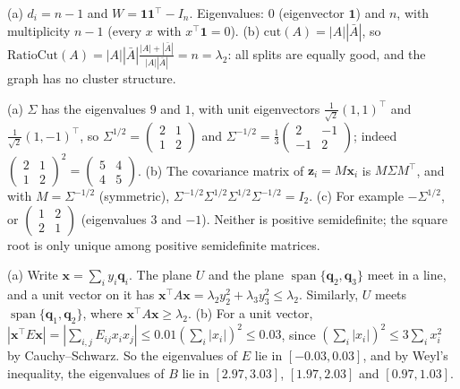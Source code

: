 \documentclass[11pt]{article}
\DeclareMathOperator{\Span}{span}
\begin{document}
\begin{description}[leftmargin=0pt, itemsep=0.3em]
    \item[\ref{pr:laplacian-complete}.] (a) $d_i = n - 1$ and $W = \mathbf{1}\mathbf{1}^\top - I_n$. Eigenvalues: $0$ (eigenvector $\mathbf{1}$) and $n$, with multiplicity $n - 1$ (every $x$ with $x^\top\mathbf{1} = 0$). (b) $\mathrm{cut}(A) = |A||\bar{A}|$, so $\mathrm{RatioCut}(A) = |A||\bar{A}|\frac{|A| + |\bar{A}|}{|A||\bar{A}|} = n = \lambda_2$: all splits are equally good, and the graph has no cluster structure.
    \item[\ref{pr:sqrt-whitening}.] (a) $\Sigma$ has the eigenvalues $9$ and $1$, with unit eigenvectors $\frac{1}{\sqrt{2}}(1, 1)^\top$ and $\frac{1}{\sqrt{2}}(1, -1)^\top$, so $\Sigma^{1/2} = \begin{pmatrix} 2 & 1 \\ 1 & 2 \end{pmatrix}$ and $\Sigma^{-1/2} = \frac{1}{3}\begin{pmatrix} 2 & -1 \\ -1 & 2 \end{pmatrix}$; indeed $\begin{pmatrix} 2 & 1 \\ 1 & 2 \end{pmatrix}^2 = \begin{pmatrix} 5 & 4 \\ 4 & 5 \end{pmatrix}$. (b) The covariance matrix of $\mathbf{z}_i = M\mathbf{x}_i$ is $M\Sigma M^\top$, and with $M = \Sigma^{-1/2}$ (symmetric), $\Sigma^{-1/2}\Sigma^{1/2}\Sigma^{1/2}\Sigma^{-1/2} = I_2$. (c) For example $-\Sigma^{1/2}$, or $\begin{pmatrix} 1 & 2 \\ 2 & 1 \end{pmatrix}$ (eigenvalues $3$ and $-1$). Neither is positive semidefinite; the square root is only unique among positive semidefinite matrices.
    \item[\ref{pr:courant-fischer}.] (a) Write $\mathbf{x} = \sum_i y_i\mathbf{q}_i$. The plane $U$ and the plane $\Span\{\mathbf{q}_2, \mathbf{q}_3\}$ meet in a line, and a unit vector on it has $\mathbf{x}^\top A\mathbf{x} = \lambda_2y_2^2 + \lambda_3y_3^2 \leq \lambda_2$. Similarly, $U$ meets $\Span\{\mathbf{q}_1, \mathbf{q}_2\}$, where $\mathbf{x}^\top A\mathbf{x} \geq \lambda_2$. (b) For a unit vector, $|\mathbf{x}^\top E\mathbf{x}| = |\sum_{i,j} E_{ij}x_ix_j| \leq 0.01(\sum_i |x_i|)^2 \leq 0.03$, since $(\sum_i |x_i|)^2 \leq 3\sum_i x_i^2$ by Cauchy--Schwarz. So the eigenvalues of $E$ lie in $[-0.03, 0.03]$, and by Weyl's inequality, the eigenvalues of $B$ lie in $[2.97, 3.03]$, $[1.97, 2.03]$ and $[0.97, 1.03]$.

\end{description}
\end{document}
